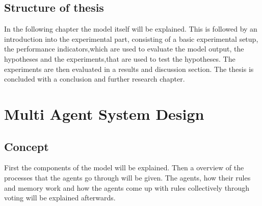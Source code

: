 \documentclass[a4paper]{article}
\begin{document}
\newpage
\subsection{Structure of thesis}
In the following chapter the model itself will be explained. This is followed by an introduction into the experimental part, 
consisting of a basic experimental setup, the performance indicators,which are used to evaluate the model output, the 
hypotheses and the experiments,that are used to test the hypotheses. The experiments are then evaluated in a 
results and discussion section. The thesis is concluded with a conclusion and further research chapter.




\clearpage

\section{Multi Agent System Design}

\subsection{Concept}
First the components of the model will be explained. Then a overview of the processes that the agents go through will be 
given. The agents, how their rules and memory work and how the agents come up with rules collectively through voting 
will be explained afterwards.
\end{document}
